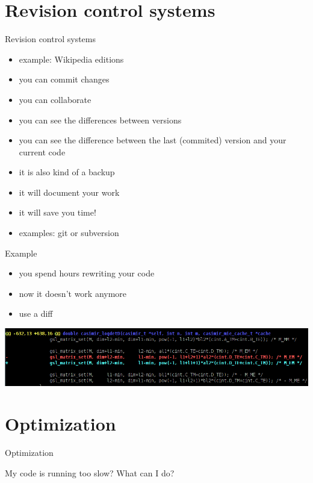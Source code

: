 \documentclass[12pt,compress,mathserif]{beamer}
\begin{document}
\section{Revision control systems}
\begin{frame}{Revision control systems}
\begin{itemize}
    \item example: Wikipedia editions
    \item you can commit changes
    \item you can collaborate
    \item you can see the differences between versions
    \item you can see the difference between the last (commited) version and your current code
    \item it is also kind of a backup
    \item it will document your work
    \item it will save you time!
    \item examples: git or subversion
\end{itemize}
\end{frame}

\begin{frame}{Example}

\begin{itemize}
\item you spend hours rewriting your code
\item now it doesn't work anymore
\item use a diff
\end{itemize}

\vfill

\includegraphics[scale=0.5]{svn.png}
\end{frame}

\section{Optimization}

\begin{frame}{Optimization}
\huge
\begin{center}
My code is running too slow? What can I do?
\end{center}
\end{frame}
\end{document}
